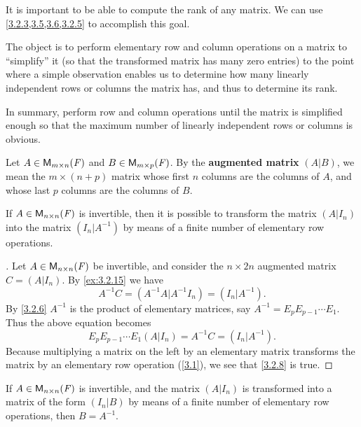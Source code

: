 \begin{note}
	It is important to be able to compute the rank of any matrix.
	We can use \cref{3.2.3,3.5,3.6,3.2.5} to accomplish this goal.

	The object is to perform elementary row and column operations on a matrix to ``simplify'' it (so that the transformed matrix has many zero entries) to the point where a simple observation enables us to determine how many linearly independent rows or columns the matrix has, and thus to determine its rank.

	In summary, perform row and column operations until the matrix is simplified enough so that the maximum number of linearly independent rows or columns is obvious.
\end{note}

\begin{defn}\label{3.2.7}
	Let \(A \in \MS\) and \(B \in \ms[m][p][\F]\).
	By the \textbf{augmented matrix} \((A | B)\), we mean the \(m \times (n + p)\) matrix whose first \(n\) columns are the columns of \(A\), and whose last \(p\) columns are the columns of \(B\).
\end{defn}

\begin{cor}\label{3.2.8}
	If \(A \in \ms[n][n][\F]\) is invertible, then it is possible to transform the matrix \((A | I_n)\) into the matrix \((I_n | A^{-1})\) by means of a finite number of elementary row operations.
\end{cor}

\begin{proof}[]
	Let \(A \in \ms[n][n][\F]\) be invertible, and consider the \(n \times 2n\) augmented matrix \(C = (A | I_n)\).
	By \cref{ex:3.2.15} we have
	\[
		A^{-1} C = (A^{-1} A | A^{-1} I_n) = (I_n | A^{-1}).
	\]
	By \cref{3.2.6} \(A^{-1}\) is the product of elementary matrices, say \(A^{-1} = E_p E_{p - 1} \cdots E_1\).
	Thus the above equation becomes
	\[
		E_p E_{p - 1} \cdots E_1 (A | I_n) = A^{-1} C = (I_n | A^{-1}).
	\]
	Because multiplying a matrix on the left by an elementary matrix transforms the matrix by an elementary row operation (\cref{3.1}), we see that \cref{3.2.8} is true.
\end{proof}

\begin{cor}\label{3.2.9}
	If \(A \in \ms[n][n][\F]\) is invertible, and the matrix \((A | I_n)\) is transformed into a matrix of the form \((I_n | B)\) by means of a finite number of elementary row operations, then \(B = A^{-1}\).
\end{cor}

